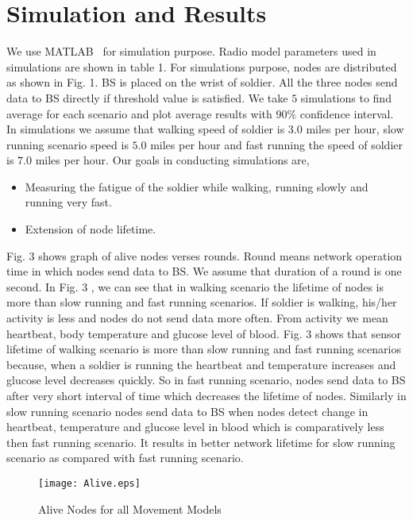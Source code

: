 \documentclass[journal]{IEEEtran}
\begin{document}
\section{Simulation and Results}
We use MATLAB~\cite{16} for simulation purpose. Radio model parameters used in simulations are shown in table 1. For simulations purpose, nodes are distributed
as shown in Fig. 1. BS is placed on the wrist of soldier. All the three nodes send data to BS directly if threshold value is satisfied. We take $5$
simulations to find average for each scenario and plot average results with $90\%$ confidence interval. In simulations we assume that walking speed of soldier
is $3.0$ miles per hour, slow running scenario speed is $5.0$ miles per hour and fast running the speed of soldier is $7.0$ miles per hour. Our goals in
conducting simulations are,
\begin{itemize}
\renewcommand{\labelitemi}{$\rightarrow$}
\item Measuring the fatigue of the soldier while walking, running slowly and running very fast.
\item Extension of node lifetime.
\end{itemize}

 Fig. 3 shows graph of alive nodes verses rounds. Round means network operation time in which nodes send data to BS. We assume that duration of a round is one second.
 In Fig. 3 , we can see that in walking scenario the lifetime of nodes is more than slow running and fast running scenarios. If soldier is walking, his/her activity
  is less and nodes do not send data more often. From activity we mean heartbeat, body temperature and glucose level of blood. Fig. 3 shows that sensor
  lifetime of walking scenario is more than slow running and fast running scenarios because, when a soldier is running the heartbeat and temperature increases and
   glucose level decreases quickly. So in fast running scenario, nodes send data to BS after very short interval of time which decreases the lifetime of
   nodes. Similarly in slow running scenario nodes send data to BS when nodes detect change in heartbeat, temperature and glucose level in blood which is
   comparatively less then fast running scenario. It results in better network lifetime for slow running scenario as compared with fast running scenario.
 \begin{figure} [!ht]
 \centering
 \texttt{[image: Alive.eps]}
 \vspace{-1cm}
 \caption{Alive Nodes for all Movement Models}
  \end{figure}
\end{document}
